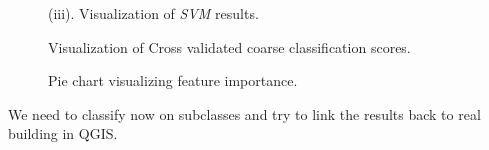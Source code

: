 \documentclass[../main.tex]{subfile}
\begin{document}
\begin{figure}[H]
{{\begin{subfloatrow}[1]
                \end{subfloatrow}
            }
            {
                \caption*{(iii). Visualization of \textit{SVM} results.}
            }
        }
        {
            \caption{\label{fig::class_viz} Visualization of Cross validated coarse classification scores.}
        }
    \end{figure}

    \begin{figure}[H]
        {
            \caption{\label{fig::feat_import} Pie chart visualizing feature importance.}
        }
    \end{figure}

    We need to classify now on subclasses and try to link the results back to real building in QGIS\@.
\end{document}
